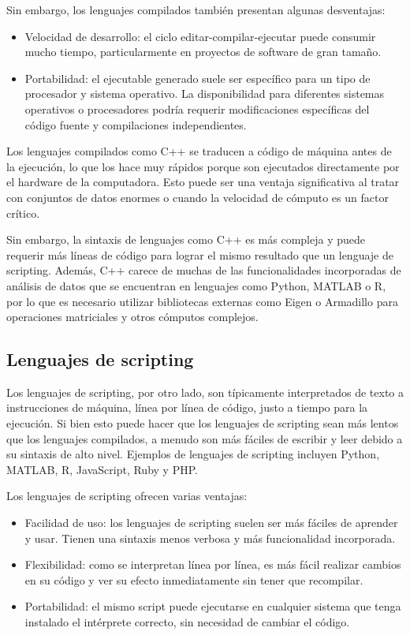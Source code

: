 Sin embargo, los lenguajes compilados también presentan algunas desventajas:

\begin{itemize}
	\item Velocidad de desarrollo: el ciclo editar-compilar-ejecutar puede consumir mucho tiempo, particularmente en proyectos de software de gran tamaño.
	\item Portabilidad: el ejecutable generado suele ser específico para un tipo de procesador y sistema operativo. La disponibilidad para diferentes sistemas operativos o procesadores podría requerir modificaciones específicas del código fuente y compilaciones independientes.
\end{itemize}

Los lenguajes compilados como C++ se traducen a código de máquina antes de la ejecución, lo que los hace muy rápidos porque son ejecutados directamente por el hardware de la computadora. Esto puede ser una ventaja significativa al tratar con conjuntos de datos enormes o cuando la velocidad de cómputo es un factor crítico.

Sin embargo, la sintaxis de lenguajes como C++ es más compleja y puede requerir más líneas de código para lograr el mismo resultado que un lenguaje de scripting. Además, C++ carece de muchas de las funcionalidades incorporadas de análisis de datos que se encuentran en lenguajes como Python, MATLAB o R, por lo que es necesario utilizar bibliotecas externas como Eigen o Armadillo para operaciones matriciales y otros cómputos complejos.

\subsection{Lenguajes de scripting}

Los lenguajes de scripting, por otro lado, son típicamente interpretados de texto a instrucciones de máquina, línea por línea de código, justo a tiempo para la ejecución. Si bien esto puede hacer que los lenguajes de scripting sean más lentos que los lenguajes compilados, a menudo son más fáciles de escribir y leer debido a su sintaxis de alto nivel. Ejemplos de lenguajes de scripting incluyen Python, MATLAB, R, JavaScript, Ruby y PHP.

Los lenguajes de scripting ofrecen varias ventajas:

\begin{itemize}
	\item Facilidad de uso: los lenguajes de scripting suelen ser más fáciles de aprender y usar. Tienen una sintaxis menos verbosa y más funcionalidad incorporada.
	\item Flexibilidad: como se interpretan línea por línea, es más fácil realizar cambios en su código y ver su efecto inmediatamente sin tener que recompilar.
	\item Portabilidad: el mismo script puede ejecutarse en cualquier sistema que tenga instalado el intérprete correcto, sin necesidad de cambiar el código.
\end{itemize}


